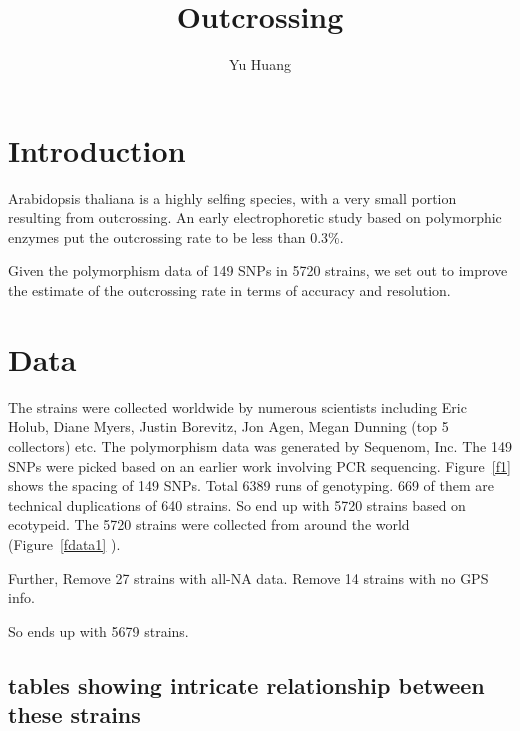 \documentclass[a4paper,10pt]{article}
\title{Outcrossing}
\author{Yu Huang}
\begin{document}
\maketitle

\begin{abstract}

\end{abstract}

\tableofcontents

\section{Introduction}
Arabidopsis thaliana is a highly selfing species, with a very small portion resulting from outcrossing. An early electrophoretic study based on polymorphic enzymes\cite{Abbott1989} put the outcrossing rate to be less than 0.3\%.

Given the polymorphism data of 149 SNPs in 5720 strains, we set out to improve the estimate of the outcrossing rate in terms of accuracy and resolution.

\section{Data}
The strains were collected worldwide by numerous scientists including Eric Holub, Diane Myers, Justin Borevitz, Jon Agen, Megan Dunning (top 5 collectors) etc. The polymorphism data was generated by Sequenom, Inc. The 149 SNPs were picked based on an earlier work involving PCR sequencing\cite{Nordborg2005}. Figure~\ref{f1} shows the spacing of 149 SNPs.
Total 6389 runs of genotyping. 669 of them are technical duplications of 640 strains. So end up with 5720 strains based on ecotypeid. The 5720 strains were collected from around the world (Figure~\ref{fdata1} ).

Further, Remove 27 strains with all-NA data. Remove 14 strains with no GPS info.

So ends up with 5679 strains.

\subsection{tables showing intricate relationship between these strains}

\end{document}
